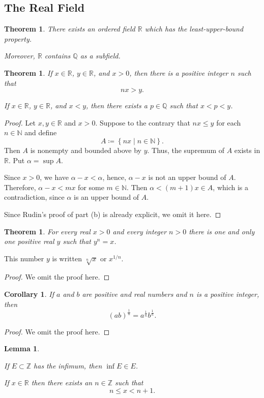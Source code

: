 \documentclass[11pt]{article}
\theoremstyle{definition}
\theoremstyle{plain}
\newtheorem{theorem}[definition]{Theorem}
\newtheorem{lemma}[definition]{Lemma}
\newtheorem{corollary}[definition]{Corollary}
\theoremstyle{remark}
\newcommand{\N}{\mathbb{N}}
\newcommand{\Z}{\mathbb{Z}}
\newcommand{\Q}{\mathbb{Q}}
\newcommand{\R}{\mathbb{R}}
\begin{document}
\subsection{The Real Field}
\begin{theorem}
There exists an ordered field $\R$ which has the least-upper-bound property.

Moreover, $\R$ contains $\Q$ as a subfield.
\end{theorem}

\begin{theorem}
    \item[(a)] If $x \in \R$, $y \in \R$, and $x>0$, then there is a positive integer $n$ such that \[nx>y.\]
    \item[(b)] If $x \in \R$, $y \in \R$, and $x<y$, then there exists a $p \in \Q$ such that $x<p<y$.
\end{theorem}
\begin{proof}
\item[(a)] 
Let $x,y \in \R$ and $x>0$. 
Suppose to the contrary that $nx \leq y$ for each $n \in \N$ and define \[A \coloneqq \left\{nx \mid n \in \N \right\}.\] 
Then $A$ is nonempty and bounded above by $y$. 
Thus, the supremum of $A$ exists in $\R$. Put $\alpha = \sup A$.

Since $x>0$, we have $\alpha - x < \alpha$, hence, $\alpha-x$ is not an upper bound of $A$. Therefore, $\alpha-x<mx$ for some $m \in \N$. 
Then $\alpha < (m+1)x \in A$, which is a contradiction, since $\alpha$ is an upper bound of $A$.
\item[(b)]
Since Rudin's proof of part (b) is already explicit, we omit it here.
\end{proof}
\begin{theorem}\label{thm:nth_square_root}
For every real $x>0$ and every integer $n>0$ there is one and only one positive real $y$ such that $y^n=x$.
\end{theorem}
This number $y$ is written $\sqrt[n]{x}$ or $x^{1/n}$. 
\begin{proof}
We omit the proof here.
\end{proof}
\begin{corollary}\label{thm:associative_nth_sqrt}
If $a$ and $b$ are positive and real numbers and $n$ is a positive integer, then 
\[
(ab)^{\frac{1}{n}}=a^{\frac{1}{n}}b^{\frac{1}{n}}.
\]
\end{corollary}
\begin{proof}
We omit the proof here.
\end{proof}
\begin{lemma}\label{greatest integer}
\item[(a)] If $E \subset \Z$ has the infimum, then $\inf E \in E$.
\item[(b)] If $x \in \R$ then there exists an $n \in \Z$ such that \[n \leq x < n+1.\]
\end{lemma}
\end{document}
